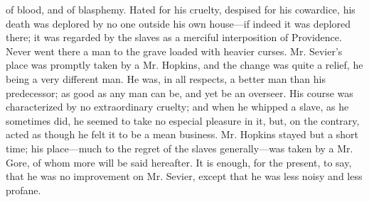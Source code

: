 of blood, and of blasphemy. Hated for his cruelty, despised for his
cowardice, his death was deplored by no one outside his own house---if
indeed it was deplored there; it was regarded by the slaves as a
merciful interposition of Providence. Never went there a man to the
grave loaded with heavier curses. Mr. Sevier's place was promptly taken
by a Mr. Hopkins, and the change was quite a relief, he being a very
different man. He was, in all respects, a better man than his
predecessor; as good as any man can be, and yet be an overseer. His
course was characterized by no extraordinary cruelty; and when he
whipped a slave, as he sometimes did, he seemed to take no especial
pleasure in it, but, on the contrary, acted as though he felt it to be a
mean business. Mr. Hopkins stayed but a short time; his place---much to
the regret of the slaves generally---was taken by a Mr. Gore, of whom
more will be said hereafter. It is enough, for the present, to say, that
he was no improvement on Mr. Sevier, except that he was less noisy and
less profane.


